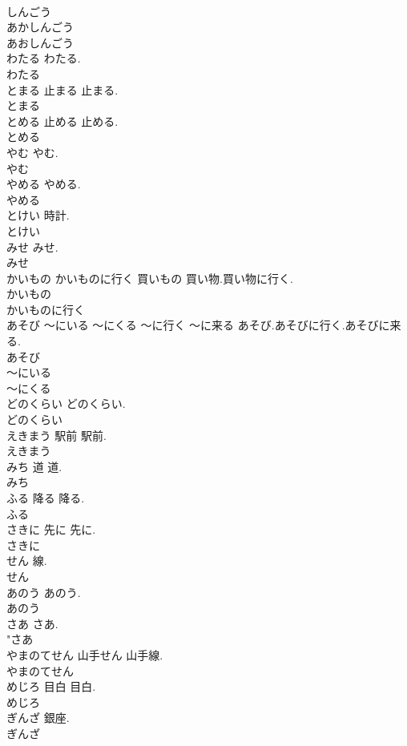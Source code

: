 \documentclass[8pt]{extreport}
\begin{document}
\begin{CJK}{UTF8}{min}
\\	しんごう
\\	あかしんごう
\\	あおしんごう
\\	わたる		わたる.	
\\	わたる
\\	とまる	止まる	止まる.	
\\	とまる
\\	とめる	止める	止める.	
\\	とめる
\\	やむ		やむ.	
\\	やむ
\\	やめる		やめる.	
\\	やめる
\\	とけい		時計.	
\\	とけい
\\	みせ		みせ.	
\\	みせ
\\	かいもの かいものに行く	買いもの	買い物.買い物に行く.	
\\	かいもの
\\	かいものに行く
\\	あそび ～にいる ～にくる	～に行く ～に来る	あそび.あそびに行く.あそびに来る.	
\\	あそび
\\	～にいる
\\	～にくる
\\	どのくらい		どのくらい.	
\\	どのくらい
\\	えきまう	駅前	駅前.	
\\	えきまう
\\	みち	道	道.	
\\	みち
\\	ふる	降る	降る.	
\\	ふる
\\	さきに	先に	先に.	
\\	さきに
\\	せん		線.	
\\	せん
\\	あのう		あのう.	
\\	あのう
\\	さあ		さあ.	
\\	"さあ
\\	やまのてせん	山手せん	山手線.	
\\	やまのてせん
\\	めじろ	目白	目白.	
\\	めじろ
\\	ぎんざ		銀座.	
\\	ぎんざ

\end{CJK}
\end{document}
